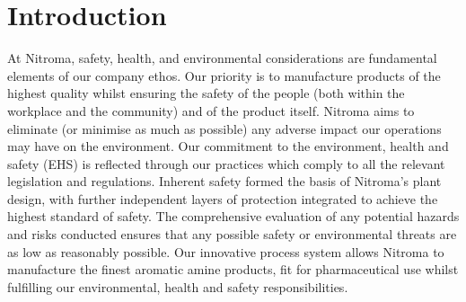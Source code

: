 \section{Introduction}

At Nitroma, safety, health, and environmental considerations are fundamental elements of our company ethos. Our priority is to manufacture products of the highest quality whilst ensuring the safety of the people (both within the workplace and the community) and of the product itself. Nitroma aims to eliminate (or minimise as much as possible) any adverse impact our operations may have on the environment. Our commitment to the environment, health and safety (EHS) is reflected through our practices which comply to all the relevant legislation and regulations. Inherent safety formed the basis of Nitroma’s plant design, with further independent layers of protection integrated  to achieve the highest standard of safety. The comprehensive evaluation of any potential hazards and risks conducted ensures that any possible safety or environmental threats are as low as reasonably possible. Our innovative process system allows Nitroma to manufacture the finest aromatic amine products, fit for pharmaceutical use whilst fulfilling our environmental, health and safety responsibilities.


